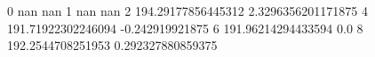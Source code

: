 0 nan nan
1 nan nan
2 194.29177856445312 2.3296356201171875
4 191.71922302246094 -0.242919921875
6 191.96214294433594 0.0
8 192.2544708251953 0.292327880859375
